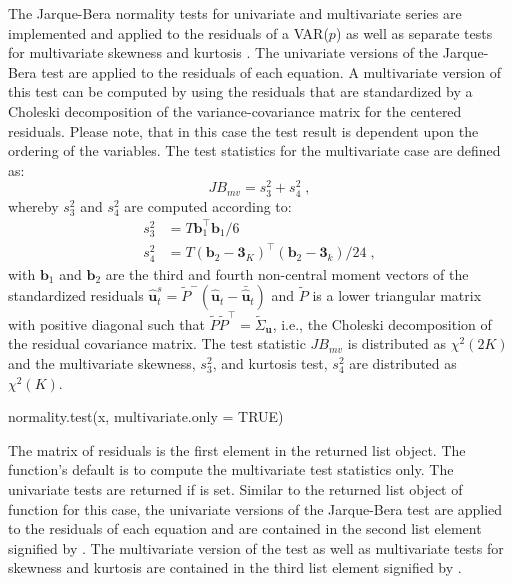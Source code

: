 \documentclass[nojss]{jss}
\begin{document}
The Jarque-Bera normality tests for univariate and multivariate series
are implemented and applied to the residuals of a VAR($p$) as well as
separate tests for multivariate skewness and kurtosis
\citep[see][]{BER1980, BER1981, JAR1987, LUE2006}. The univariate
versions of the Jarque-Bera test are applied to the residuals of each
equation. A multivariate version of this test can be computed by using
the residuals that are standardized by a Choleski decomposition of the
variance-covariance matrix for the centered residuals. Please note,
that in this case the test result is dependent upon the ordering of
the variables. The test statistics for the multivariate case are defined as:
%
\begin{equation}
JB_{mv} = s_3^2 + s_4^2 \; ,
\end{equation}
%
whereby $s_3^2$ and $s_4^2$ are computed according to:
%
\begin{subequations}
\begin{align}
s_3^2 &= T \mathbf{b}_1^\top\mathbf{b}_1 / 6\label{1st} \\
s_4^2 &= T( \mathbf{b}_2 - \mathbf{3}_K)^\top(\mathbf{b}_2 - \mathbf{3}_k)
/ 24 \; , 
\end{align}
\end{subequations}
%
with $\mathbf{b}_1$ and $\mathbf{b}_2$ are the third and fourth
non-central moment vectors of the standardized residuals
$\hat{\mathbf{u}}_t^s = \tilde{P}^{-}(\hat{\mathbf{u}}_t -
\bar{\hat{\mathbf{u}}}_t)$ and $\tilde{P}$ is a lower triangular
matrix with positive diagonal such that $\tilde{P}\tilde{P}^\top =
\tilde{\Sigma}_{\mathbf{u}}$, i.e., the Choleski decomposition
of the residual covariance matrix. The test statistic $JB_{mv}$ is
distributed as $\chi^2(2K)$ and the multivariate skewness, $s_3^2$,
and kurtosis test, $s_4^2$ are distributed as $\chi^2(K)$. 
\begin{CodeInput}
normality.test(x, multivariate.only = TRUE)    
\end{CodeInput}  
The matrix of residuals is the first element in the returned
list object. The function's default is to compute the multivariate test
statistics only. The univariate tests are returned if
 is set. Similar to the returned list
object of function  for this case, the univariate
versions of the Jarque-Bera test are applied to the residuals of each
equation and are contained in the second list element signified by
. The multivariate version of the test as well as
multivariate tests for skewness and kurtosis are contained in the
third list element signified by .
\end{document}
